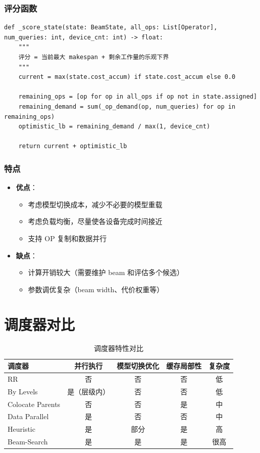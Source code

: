 \documentclass[12pt,a4paper]{article}
\begin{document}
\subsubsection{评分函数}

\begin{lstlisting}
def _score_state(state: BeamState, all_ops: List[Operator], num_queries: int, device_cnt: int) -> float:
    """
    评分 = 当前最大 makespan + 剩余工作量的乐观下界
    """
    current = max(state.cost_accum) if state.cost_accum else 0.0
    
    remaining_ops = [op for op in all_ops if op not in state.assigned]
    remaining_demand = sum(_op_demand(op, num_queries) for op in remaining_ops)
    optimistic_lb = remaining_demand / max(1, device_cnt)
    
    return current + optimistic_lb
\end{lstlisting}

\subsubsection{特点}

\begin{itemize}
    \item \textbf{优点}：
    \begin{itemize}
        \item 考虑模型切换成本，减少不必要的模型重载
        \item 考虑负载均衡，尽量使各设备完成时间接近
        \item 支持 OP 复制和数据并行
    \end{itemize}
    \item \textbf{缺点}：
    \begin{itemize}
        \item 计算开销较大（需要维护 beam 和评估多个候选）
        \item 参数调优复杂（beam width、代价权重等）
    \end{itemize}
\end{itemize}

\section{调度器对比}

\begin{table}[h]
\centering
\begin{tabular}{|l|c|c|c|c|}
\hline
调度器 & 并行执行 & 模型切换优化 & 缓存局部性 & 复杂度 \\
\hline
RR & 否 & 否 & 否 & 低 \\
\hline
By Levels & 是（层级内） & 否 & 否 & 低 \\
\hline
Colocate Parents & 否 & 否 & 是 & 中 \\
\hline
Data Parallel & 是 & 否 & 否 & 中 \\
\hline
Heuristic & 是 & 部分 & 是 & 高 \\
\hline
Beam-Search & 是 & 是 & 是 & 很高 \\
\hline
\end{tabular}
\caption{调度器特性对比}
\end{table}
\end{document}

